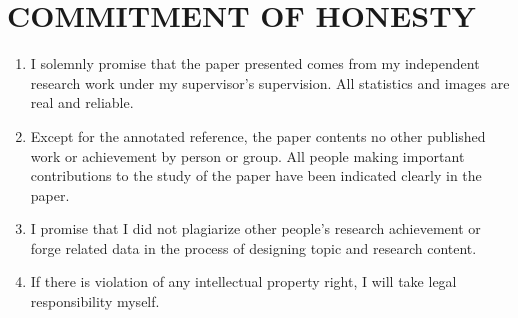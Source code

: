 \chapter*{COMMITMENT OF HONESTY}
\label{chap:honest}

\begin{enumerate}
\item I solemnly promise that the paper presented comes from my
independent research work under my supervisor’s supervision. All
statistics and images are real and reliable.

\item Except for the annotated reference, the paper contents no other
published work or achievement by person or group. All people making
important contributions to the study of the paper have been indicated
clearly in the paper.
\item I promise that I did not plagiarize other people’s research achievement
or forge related data in the process of designing topic and research
content.

\item If there is violation of any intellectual property right, I will take legal
responsibility myself.
\end{enumerate}

\baselineskip


